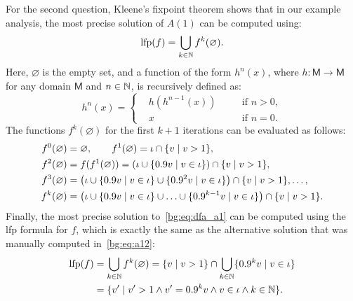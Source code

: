 For the second question, Kleene's fixpoint theorem shows that in our example
analysis, the most precise solution of $A(1)$ can be computed using:
\begin{equation}
    \operatorname{\mathrm{lfp}} (f) = \bigcup_{k \in \mathbb{N}} f^k (\varnothing).
\end{equation}
Here, $\varnothing$ is the empty set, and a function of the form $h^n(x)$,
where $h: \mathsf{M} \to \mathsf{M}$ for any domain $\mathsf{M}$ and $n \in
\mathbb{N}$, is recursively defined as:
\begin{equation}
    h^n(x) = \left\{
        \begin{aligned}
            & h(h^{n-1}(x)) \quad && \text{if~} n > 0, \\
            & x && \text{if~} n = 0.
        \end{aligned}
    \right.
\end{equation}
The functions $f^k(\varnothing)$ for the first $k+1$ iterations can be
evaluated as follows:
\begin{equation}
    \begin{aligned}
        f^0(\varnothing) &= \varnothing, \quad\quad
        f^1(\varnothing) = \iota \cap \{ v \mid v > 1 \}, \\
        f^2(\varnothing) &= f(f^1(\varnothing))
               = \left(
                     \iota \cup
                     \{ 0.9v \mid v \in \iota \}
                 \right) \cap \{ v \mid v > 1 \}, \\
        f^3(\varnothing) &= \left(
                     \iota \cup
                     \{ 0.9v \mid v \in \iota \} \cup
                     \{ 0.9^2 v \mid v \in \iota \}
                 \right) \cap \{ v \mid v > 1 \}, \mathellipsis, \\
        f^k(\varnothing) &= \left(
                     \iota \cup
                     \{ 0.9v \mid v \in \iota \} \cup
                     \mathellipsis \cup
                     \{ 0.9^{k-1} v \mid v \in \iota \}
                 \right) \cap \{ v \mid v > 1 \}.
    \end{aligned}
\end{equation}
Finally, the most precise solution to~\eqref{bg:eq:dfa_a1} can be computed
using the \gls{lfp} formula for $f$, which is exactly the same as the
alternative solution that was manually computed in~\eqref{bg:eq:a12}:
\begin{equation}
    \begin{aligned}
        \operatorname{\mathrm{lfp}} (f)
            &= \bigcup_{k \in \mathbb{N}} f^k (\varnothing)
             = \{ v \mid v > 1 \} \cap
               \bigcup_{k \in \mathbb{N}} \{ 0.9^k v \mid v \in \iota \} \\
            &= \{
               v^\prime \mid
               v^\prime > 1 \wedge v^\prime = 0.9^k v \wedge
               v \in \iota \wedge k \in \mathbb{N}
            \}.
    \end{aligned}
\end{equation}


